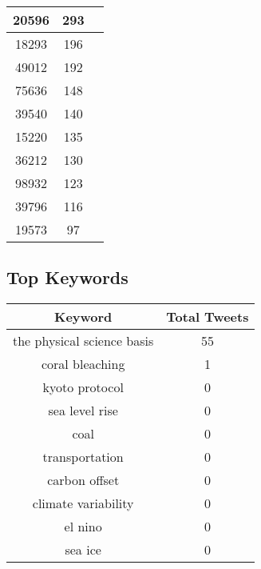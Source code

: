 \documentclass{article}\usepackage[T1]{fontenc}
\begin{document}
\begin{tabular}{|c|c|c|}
 \hline
20596 & 293\\ 
 \hline
18293 & 196\\ 
 \hline
49012 & 192\\ 
 \hline
75636 & 148\\ 
 \hline
39540 & 140\\ 
 \hline
15220 & 135\\ 
 \hline
36212 & 130\\ 
 \hline
98932 & 123\\ 
 \hline
39796 & 116\\ 
 \hline
19573 & 97\\ 
 \hline
\end{tabular}\subsection*{Top Keywords}\begin{tabular}{|c|c|}         \hline         Keyword & Total Tweets \\ 
 \hline
the physical science basis & 55\\ 
 \hline
coral bleaching & 1\\ 
 \hline
kyoto protocol & 0\\ 
 \hline
sea level rise & 0\\ 
 \hline
coal & 0\\ 
 \hline
transportation & 0\\ 
 \hline
carbon offset & 0\\ 
 \hline
climate variability & 0\\ 
 \hline
el nino & 0\\ 
 \hline
sea ice & 0\\ 
 \hline
\end{tabular}
\end{document}
